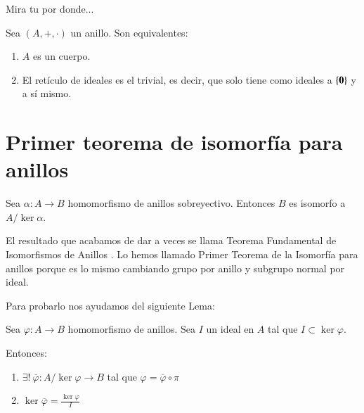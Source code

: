 Mira tu por donde...

\begin{pro}
	Sea $(A, +, \cdot)$ un anillo. Son equivalentes:
	\begin{enumerate}
		\item $A$ es un cuerpo.
		\item El retículo de ideales es el trivial, es decir, que solo tiene como ideales a $\{\mathbf{0}\}$ y a sí mismo.
	\end{enumerate}
\end{pro}

\section{Primer teorema de isomorfía para anillos}

\begin{thm}
	Sea $\alpha: A \to B$ homomorfismo de anillos sobreyectivo. Entonces $B$ es isomorfo a $A/\ker\alpha$.
\end{thm}

El resultado que acabamos de dar a veces se llama Teorema Fundamental de Isomorfismos de Anillos \cite{dor96}. Lo hemos llamado Primer Teorema de la Isomorfía para anillos porque es lo mismo cambiando grupo por anillo y subgrupo normal por ideal.

\begin{figure}[h]
	\centering
\end{figure}

Para probarlo nos ayudamos del siguiente Lema:

\begin{lm}
	Sea $\varphi: A \to B$ homomorfismo de anillos. Sea $I$ un ideal en $A$ tal que $I \subset \ker \varphi$.
	\begin{figure}[h]
		\centering
	\end{figure}
	Entonces:
	\begin{enumerate}
		\item $\exists !\ \overline{\varphi} : A / \ker \varphi \to B$ tal que $\varphi = \overline{\varphi} \circ \pi$
		\item $\ker \overline{\varphi} = \frac{\ker \varphi}{I}$
	\end{enumerate}
\end{lm}

